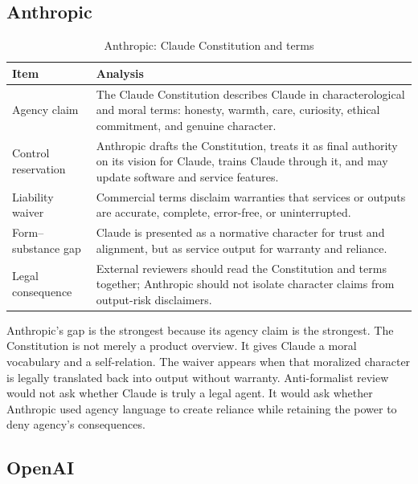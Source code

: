 \documentclass[11pt,a4paper]{article}
\begin{document}
\subsection{Anthropic}

\begin{table}[htbp]
\centering
\small
\caption{Anthropic: Claude Constitution and terms}
\label{tab:anthropic}
\begin{tabularx}{\textwidth}{@{}P{3.2cm}Y@{}}
\toprule
\textbf{Item} & \textbf{Analysis} \\
\midrule
Agency claim & The Claude Constitution describes Claude in characterological and moral terms: honesty, warmth, care, curiosity, ethical commitment, and genuine character. \\
Control reservation & Anthropic drafts the Constitution, treats it as final authority on its vision for Claude, trains Claude through it, and may update software and service features. \\
Liability waiver & Commercial terms disclaim warranties that services or outputs are accurate, complete, error-free, or uninterrupted. \\
Form--substance gap & Claude is presented as a normative character for trust and alignment, but as service output for warranty and reliance. \\
Legal consequence & External reviewers should read the Constitution and terms together; Anthropic should not isolate character claims from output-risk disclaimers. \\
\bottomrule
\end{tabularx}
\end{table}

Anthropic's gap is the strongest because its agency claim is the strongest. The Constitution is not merely a product overview. It gives Claude a moral vocabulary and a self-relation. The waiver appears when that moralized character is legally translated back into output without warranty. Anti-formalist review would not ask whether Claude is truly a legal agent. It would ask whether Anthropic used agency language to create reliance while retaining the power to deny agency's consequences.

\subsection{OpenAI}
\end{document}
